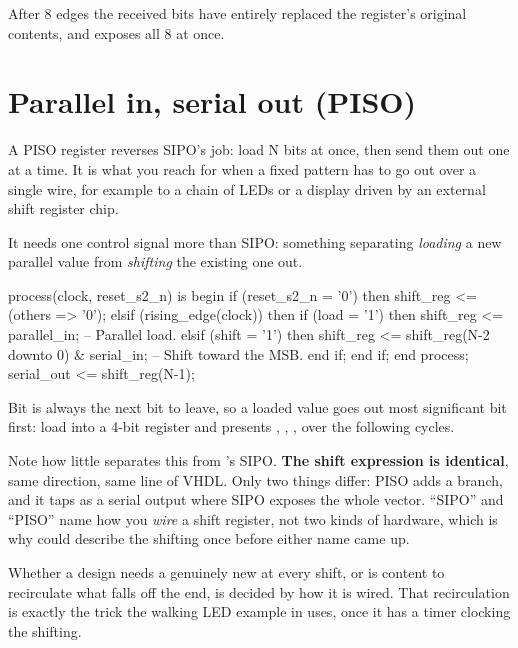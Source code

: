 After 8 edges the received bits have entirely replaced the register's original contents, and
 exposes all 8 at once.

\section{Parallel in, serial out (PISO)}
\label{c6:sec:piso}

A PISO register reverses SIPO's job: load N bits at once, then send them out one at a time. It is
what you reach for when a fixed pattern has to go out over a single wire, for example to a chain of
LEDs or a display driven by an external shift register chip.

It needs one control signal more than SIPO: something separating \emph{loading} a new parallel value
from \emph{shifting} the existing one out.

\begin{vhdlcode}
process(clock, reset_s2_n) is
begin
    if (reset_s2_n = '0') then
        shift_reg <= (others => '0');
    elsif (rising_edge(clock)) then
        if (load = '1') then
            shift_reg <= parallel_in;                          -- Parallel load.
        elsif (shift = '1') then
            shift_reg <= shift_reg(N-2 downto 0) & serial_in;  -- Shift toward the MSB.
        end if;
    end if;
end process;
serial_out <= shift_reg(N-1);
\end{vhdlcode}

Bit  is always the next bit to leave, so a loaded value goes out most significant bit
first: load  into a 4-bit register and  presents , ,
,  over the following cycles.

Note how little separates this from 's SIPO. \textbf{The shift expression is
identical}, same direction, same line of VHDL. Only two things differ: PISO adds a 
branch, and it taps  as a serial output where SIPO exposes the whole vector.
``SIPO'' and ``PISO'' name how you \emph{wire} a shift register, not two kinds of hardware, which is
why  could describe the shifting once before either name came up.

Whether a design needs a genuinely new  at every shift, or is content to recirculate
what falls off the end, is decided by how it is wired. That recirculation is exactly the trick the
walking LED example in  uses, once it has a timer clocking the shifting.


